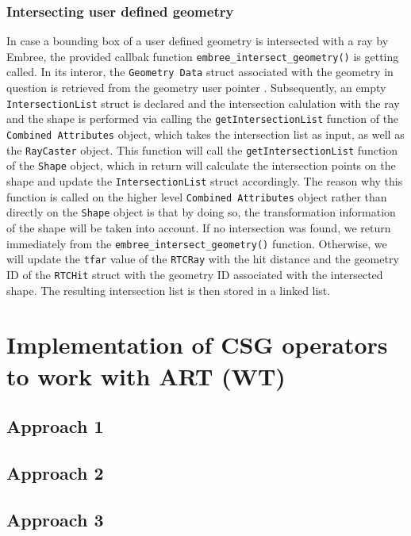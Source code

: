 \subsubsection{Intersecting user defined geometry}
In case a bounding box of a user defined geometry is intersected with a ray by Embree, the provided callbak function \texttt{embree\_intersect\_geometry()} is getting called. In its interor, the \texttt{Geometry Data} struct associated with the geometry in question is retrieved from the geometry user pointer . Subsequently, an empty \texttt{IntersectionList}  struct is declared and the intersection calulation with the ray and the shape is performed via calling the \texttt{getIntersectionList} function of the \texttt{Combined Attributes} object, which takes the intersection list as input, as well as the \texttt{RayCaster} object. This function will call the \texttt{getIntersectionList} function of the \texttt{Shape} object, which in return will calculate the intersection points on the shape and update the \texttt{IntersectionList} struct accordingly. The reason why this function is called on the higher level \texttt{Combined Attributes} object rather than directly on the \texttt{Shape} object is that by doing so, the transformation information of the shape will be taken into account.
If no intersection was found, we return immediately from the \texttt{embree\_intersect\_geometry()} function. Otherwise, we will update the \texttt{tfar} value of the \texttt{RTCRay} with the hit distance and the geometry ID of the \texttt{RTCHit} struct with the geometry ID associated with the intersected shape. 
The resulting intersection list is then stored in a linked list. 




\section{Implementation of CSG operators to work with ART (WT)}
\label{sec:embree_csg}
\subsection{Approach 1}
\subsection{Approach 2}
\subsection{Approach 3}

